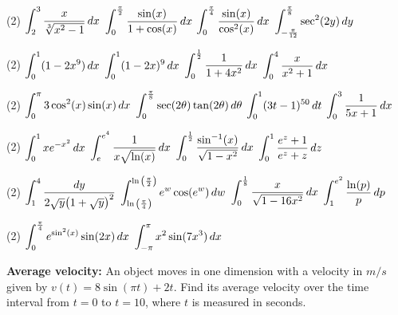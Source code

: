 \documentclass[answers]{exam}
\begin{document}
  \begin{tasks}[after-item-skip=\stretch{1}, resume](2)
    \task $\ds\int_2^3 \frac{x}{\sqrt[3]{x^2-1}}\,dx$
    \task $\ds\int_{0}^{\frac{\pi}{2}} \frac{\sin(x)}{1+\cos(x)}\,dx$
    \task $\ds\int_0^{\frac{\pi}{4}} \frac{\sin(x)}{\cos^2(x)}\,dx$
    \task $\ds\int_{-\frac{\pi}{12}}^{\frac{\pi}{8}} \sec^2(2y)\,dy$
  \end{tasks}
  \pagebreak
  
  \begin{tasks}[after-item-skip=\stretch{1}, resume](2)
    \task $\ds\int_0^1 (1-2x^9)\,dx$
    \task $\ds\int_0^1 (1-2x)^9\,dx$
    \task $\ds\int_0^{\frac{1}{2}} \frac{1}{1+4x^2}\,dx$
    \task $\ds\int_0^4 \frac{x}{x^2+1}\,dx$
  \end{tasks}
  \pagebreak
  
  \begin{tasks}[after-item-skip=\stretch{1}, resume](2)
    \task $\ds\int_0^\pi 3\cos^2(x)\sin(x)\,dx$
    \task $\ds\int_0^{\frac{\pi}{8}} \sec(2\theta)\tan(2\theta)\,d\theta$
    \task $\ds\int_0^1 (3t-1)^{50}\,dt$
    \task $\ds\int_0^3 \frac{1}{5x+1}\,dx$
  \end{tasks}
  \pagebreak
  
  \begin{tasks}[after-item-skip=\stretch{1}, resume](2)
    \task $\ds\int_0^1 xe\inv[x^2]\,dx$
    \task $\ds\int_e^{e^4} \frac{1}{x\sqrt{\ln(x)}}\,dx$
    \task $\ds\int_0^{\frac{1}{2}} \frac{\sin\inv(x)}{\sqrt{1-x^2}}\,dx$
    \task $\ds\int_0^1 \frac{e^z+1}{e^z+z}\,dz$
  \end{tasks}
  \pagebreak
  
  \begin{tasks}[after-item-skip=\stretch{1}, resume](2)
    \task $\ds\int_1^4 \frac{dy}{2\sqrt{y}\parens{1+\sqrt{y}}^2}$
    \task $\ds\int_{\ln\parens{\frac{\pi}{4}}}^{\ln\parens{\frac{\pi}{2}}} e^w\cos(e^w)\,dw$
    \task $\ds\int_0^{\frac{1}{8}} \frac{x}{\sqrt{1-16x^2}}\,dx$
    \task $\ds\int_1^{e^2} \frac{\ln(p)}{p}\,dp$
  \end{tasks}
  \pagebreak
  
  \begin{tasks}[after-item-skip=\stretch{1}, resume](2)
    \task $\ds\int_0^{\frac{\pi}{4}} e^{\sin^2(x)}\sin(2x)\,dx$
    \task $\ds\int_{-\pi}^{\pi} x^2\sin(7x^3)\,dx$
  \end{tasks}
  \begin{ex*}
    \textbf{Average velocity:} An object moves in one dimension with a velocity in $m/s$ given by $v(t)=8\sin(\pi t)+2t$. Find its average velocity over the time interval from $t=0$ to $t=10$, where $t$ is measured in seconds.
  \end{ex*}
  \pagebreak
  
\end{document}

